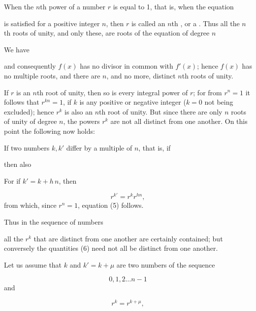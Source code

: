 When the $n$th power of a number $r$ is equal to 1, that is, when the equation

is satisfied for a positive integer $n$, then $r$ is called an $n$th
, or a . Thus all the $n$th
roots of unity, and only these, are roots of the equation of degree $n$

We have

and consequently $f(x)$ has no divisor in common with $f'(x)$; hence $f(x)$ has no
multiple roots, and there are $n$, and no more, distinct
$n$th roots of unity.

If $r$ is an $n$th root of unity, then so is every integral power of $r$;
for from $r^n = 1$ it follows that $r^{kn} = 1$, if $k$ is any positive or negative
integer ($k = 0$ not being excluded); hence $r^k$ is also an $n$th
root of unity. But since there are only $n$ roots of unity of degree $n$, the
powers $r^k$ are not all distinct from one another. On this point the following now holds:

If two numbers $k, k'$ differ by a multiple of $n$, that is, if

then also

For if $k' = k + h\,n$, then

\[
r^{k'} = r^k r^{h n},
\]
from which, since $r^n = 1$, equation (5) follows.

Thus in the sequence of numbers

all the $r^k$ that are distinct from one another are certainly contained; but conversely
the quantities (6) need not all be distinct from one another.

Let us assume that $k$ and $k' = k + \mu$ are two numbers of the sequence

\[
0, 1, 2 \ldots n-1
\]
and

\[
r^k = r^{k+\mu},
\]
